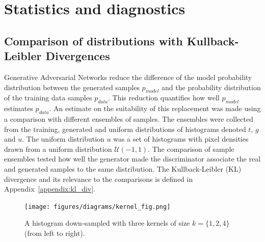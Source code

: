 \documentclass[twocolumn]{article}
\numberwithin{equation}{section}
\begin{document}



\section{Statistics and diagnostics}\label{sec:stats_and_diags}
\subsection{Comparison of distributions with Kullback-Leibler Divergences}
Generative Adversarial Networks reduce the difference of the model probability distribution between the generated samples 
$p_{model}$ and the probability distribution of the training data samples $p_{data}$. This reduction quantifies how well 
$p_{model}$ estimates $p_{data}$. An estimate on the suitability of this replacement was made using a comparison with 
different ensembles of samples. The ensembles were collected from the training, generated and uniform distributions of 
histograms denoted $t$, $g$ and $u$. The uniform distribution $u$ was a set of histograms with pixel densities drawn from 
a uniform distribution $\mathcal{U}(-1,1)$. The comparison of sample ensembles tested how well the generator made the 
discriminator associate the real and generated samples to the same distribution. The Kullback-Leibler (KL) divergence and 
its relevance to the comparisons is defined in Appendix~\ref{appendix:kl_div}.

\begin{figure}[!ht]%
\texttt{[image: figures/diagrams/kernel\_fig.png]}
\centering
\caption{A histogram down-sampled with three kernels of size $k=\{1, 2, 4\}$ (from left to right).}
\label{fig:kernel_fig}
\end{figure}
\end{document}
